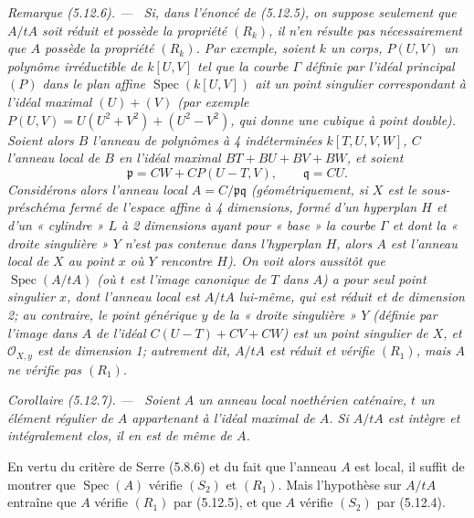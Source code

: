 \documentclass[10pt,oneside]{book}
\newcommand{\oldpage}[2][]{%
  \setcounter{footnote}{0}%
  \marginpar{\scriptsize\textbf{#1}~|~#2}\ignorespaces}
\newenvironment{corollary}[1][]{%
  \par\medskip\noindent\itshape Corollaire (#1). ---\ }{\par}
\newenvironment{remark}[1][]{%
  \par\medskip\noindent\itshape Remarque (#1). ---\ }{\par}
\begin{document}
\begin{remark}[5.12.6]
\label{IV.2.s5.12.6-fr}
Si, dans l'énoncé de (5.12.5), on suppose seulement que $A/tA$ soit réduit et
possède la propriété $(R_k)$, il n'en résulte pas nécessairement que $A$
possède la propriété $(R_k)$. Par exemple, soient $k$ un corps, $P(U,V)$ un
polynôme irréductible de $k[U,V]$ tel que la courbe $\Gamma$ définie par
l'idéal principal $(P)$ dans le plan affine $\operatorname{Spec}(k[U,V])$ ait
un point singulier correspondant à l'idéal maximal $(U)+(V)$ (par exemple
$P(U,V)=U(U^2+V^2)+(U^2-V^2)$, qui donne une cubique à point double). Soient
alors $B$ l'anneau de polynômes à 4 indéterminées $k[T,U,V,W]$, $C$ l'anneau
local de $B$ en l'idéal maximal $BT+BU+BV+BW$, et soient
\[
\mathfrak p=CW+CP(U-T,V),\qquad \mathfrak q=CU.
\]
Considérons alors l'anneau local $A=C/\mathfrak p\mathfrak q$
(géométriquement, si $X$ est le sous-préschéma fermé de l'espace affine à 4
dimensions, formé d'un hyperplan $H$ et d'un « cylindre » $L$ à 2 dimensions
ayant pour « base » la courbe $\Gamma$ et dont la « droite singulière » $Y$
n'est pas contenue dans l'hyperplan $H$, alors $A$ est l'anneau local de $X$ au
point $x$ où $Y$ rencontre $H$). On voit alors aussitôt que
$\operatorname{Spec}(A/tA)$ (où $t$ est l'image canonique de $T$ dans $A$) a
pour seul point singulier $x$, dont l'anneau local est $A/tA$ lui-même, qui est
réduit et de dimension 2; au contraire, le point générique $y$ de la « droite
singulière » $Y$ (définie par l'image dans $A$ de l'idéal
$C(U-T)+CV+CW$) est un point singulier de $X$, et
$\mathcal O_{X,y}$ est de dimension 1; autrement dit, $A/tA$ est réduit et
vérifie $(R_1)$, mais $A$ ne vérifie pas $(R_1)$.
\end{remark}

\oldpage[IV-2]{129}

\begin{corollary}[5.12.7]
\label{IV.2.s5.12.7-fr}
Soient $A$ un anneau local noethérien caténaire, $t$ un élément régulier de
$A$ appartenant à l'idéal maximal de $A$. Si $A/tA$ est intègre et
intégralement clos, il en est de même de $A$.
\end{corollary}

En vertu du critère de Serre (5.8.6) et du fait que l'anneau $A$ est local, il
suffit de montrer que $\operatorname{Spec}(A)$ vérifie $(S_2)$ et $(R_1)$.
Mais l'hypothèse sur $A/tA$ entraîne que $A$ vérifie $(R_1)$ par (5.12.5), et
que $A$ vérifie $(S_2)$ par (5.12.4).
\end{document}
